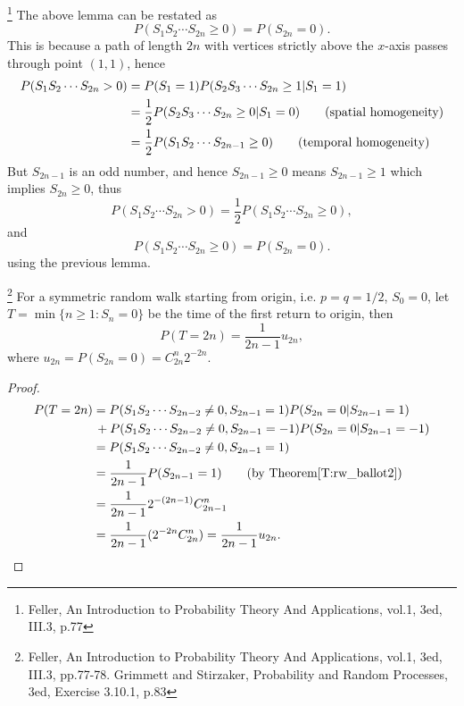 \begin{remark}
\footnote{Feller, An Introduction to Probability Theory And Applications, 
          vol.1, 3ed, III.3, p.77}
The above lemma can be restated as 
\begin{equation}
  P(S_1 S_2\cdots S_{2n} \ge 0) = P(S_{2n}=0).
\end{equation}
This is because a path of length $2n$ with vertices strictly above the 
$x$-axis passes through point $(1,1)$, hence
\begin{align*}
  P(S_1 S_2\cdots S_{2n}> 0) 
    &= P(S_1=1) P(S_2 S_3\cdots S_{2n}\ge 1 | S_1=1) \notag \\
    &= \frac{1}{2} P(S_2 S_3\cdots S_{2n}\ge 0 | S_1=0) 
       \qquad \text{(spatial homogeneity)}  \notag \\
    &= \frac{1}{2} P(S_1 S_2\cdots S_{2n-1}\ge 0) 
       \qquad \text{(temporal homogeneity)}  
\end{align*}
But $S_{2n-1}$ is an odd number, and hence $S_{2n-1}\ge 0$ means 
$S_{2n-1}\ge 1$ which implies $S_{2n}\ge 0$, thus
\[
  P(S_1 S_2\cdots S_{2n}> 0) 
    = \frac{1}{2} P(S_1 S_2\cdots S_{2n}\ge 0), 
\]
and 
\[
  P(S_1 S_2\cdots S_{2n} \ge 0) = P(S_{2n}=0).
\]
using the previous lemma.
\end{remark}

\begin{lemma}
\footnote{Feller, An Introduction to Probability Theory And Applications, 
          vol.1, 3ed, III.3, pp.77-78.
          Grimmett and Stirzaker, Probability and Random Processes, 3ed, 
          Exercise 3.10.1, p.83}
For a symmetric random walk starting from origin, i.e. $p=q=1/2$, $S_0=0$, 
let $T=\min\{n\ge 1: S_n=0\}$ be the time of the first return to origin,
then
\begin{equation}
  P(T=2n) = \frac{1}{2n-1} u_{2n},   
\end{equation}
where $u_{2n} = P(S_{2n}=0) = C_{2n}^n 2^{-2n}$.
\end{lemma}
\begin{proof}
\begin{align*}
  P(T=2n) 
    &= P(S_1 S_2 \cdots S_{2n-2}\neq 0, S_{2n-1}=1) P(S_{2n}=0 | S_{2n-1}=1)
      \notag \\
    &\, + P(S_1 S_2 \cdots S_{2n-2}\neq 0, S_{2n-1}=-1) P(S_{2n}=0 | S_{2n-1}=-1)
      \notag \\
    &= P(S_1 S_2 \cdots S_{2n-2}\neq 0, S_{2n-1}=1)  \notag \\
    &= \frac{1}{2n-1} P(S_{2n-1}=1)  
       \qquad \text{(by Theorem\ref{T:rw_ballot2})} \notag \\
    &= \frac{1}{2n-1} 2^{-(2n-1)} C_{2n-1}^n \notag \\
    &= \frac{1}{2n-1} (2^{-2n} C_{2n}^n) = \frac{1}{2n-1} u_{2n}. 
\end{align*}
\end{proof}


